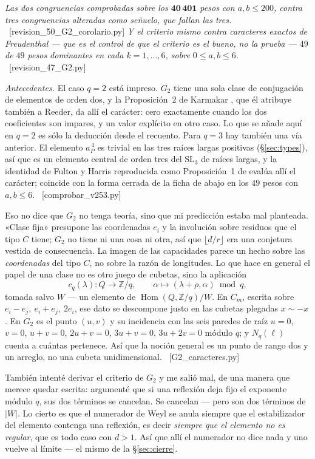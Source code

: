 \documentclass[11pt,a4paper]{article}
\newcommand{\SL}{\mathrm{SL}}
\newcommand{\ver}[1]{\unskip\penalty0\ \textcolor{azul}{\small\textsf{[#1]}}}
\begin{document}
\noindent \emph{Las dos congruencias comprobadas sobre los $\mathbf{40\,401}$ pesos con $a,b\le200$,
contra tres congruencias alteradas como señuelo, que fallan las tres.}
\ver{revision\_50\_G2\_corolario.py} \emph{Y el criterio mismo contra caracteres exactos de
Freudenthal --- que es el control de que el criterio es el bueno, no la prueba --- $49$ de $49$
pesos dominantes en cada $k=1,\dots,6$, sobre $0\le a,b\le6$.} \ver{revision\_47\_G2.py}

\noindent \emph{Antecedentes.} El caso $q=2$ está impreso. $G_2$ tiene una sola clase de
conjugación de elementos de orden dos, y la Proposición~2 de Karmakar \cite{Kar24}, que él atribuye
también a Reeder, da allí el carácter: cero exactamente cuando los dos coeficientes son impares, y
un valor explícito en otro caso. Lo que se añade aquí en $q=2$ es sólo la deducción desde el
recuento. Para $q=3$ hay también una vía anterior. El elemento $a_P^{\,4}$ es trivial en las tres
raíces largas positivas (\S\ref{sec:types}), así que es un elemento central de orden tres del
$\SL_3$ de raíces largas, y la identidad de Fulton y Harris reproducida como Proposición~1 de
\cite{Kar24} evalúa allí el carácter; coincide con la forma cerrada de la ficha de abajo en los
$49$ pesos con $a,b\le6$. \ver{comprobar\_v253.py}

\noindent Eso no dice que $G_2$ no tenga teoría, sino que mi predicción estaba mal planteada.
«Clase fija» presupone las coordenadas $e_i$ y la involución sobre residuos que el tipo $C$ tiene;
$G_2$ no tiene ni una cosa ni otra, así que $\lfloor d/r\rfloor$ era una conjetura vestida de
consecuencia. La imagen de las capacidades parece un hecho sobre las \emph{coordenadas} del tipo
$C$, no sobre la razón de longitudes. Lo que hace en general el papel de una clase no es otro juego
de cubetas, sino la aplicación
\[
c_q(\lambda):Q\longrightarrow\mathbb{Z}/q,\qquad \alpha\longmapsto(\lambda+\rho,\alpha)\bmod q,
\]
tomada salvo $W$ --- un elemento de $\operatorname{Hom}(Q,\mathbb{Z}/q)/W$. En $C_m$, escrita sobre
$e_i-e_j,\ e_i+e_j,\ 2e_i$, ese dato se descompone justo en las cubetas plegadas $x\sim-x$. En $G_2$
es el punto $(u,v)$ y su incidencia con las seis paredes de raíz $u=0$, $v=0$, $u+v=0$, $2u+v=0$,
$3u+v=0$, $3u+2v=0$ módulo $q$; y $N_q(\ell)$ cuenta a cuántas pertenece. Así que la noción
general es un punto de rango dos y un arreglo, no una cubeta unidimensional.
\ver{G2\_caracteres.py}

También intenté derivar el criterio de $G_2$ y me salió mal, de una manera que merece quedar
escrita: argumenté que si una reflexión deja fijo el exponente módulo $q$, sus dos términos se
cancelan. Se cancelan --- pero son dos términos de $|W|$. Lo cierto es que el numerador de Weyl se
anula siempre que el estabilizador del elemento contenga una reflexión, es decir \emph{siempre que el
elemento no es regular}, que es todo caso con $d>1$. Así que allí el numerador no dice nada y uno
vuelve al límite --- el mismo de la \S\ref{sec:cierre}.
\end{document}
